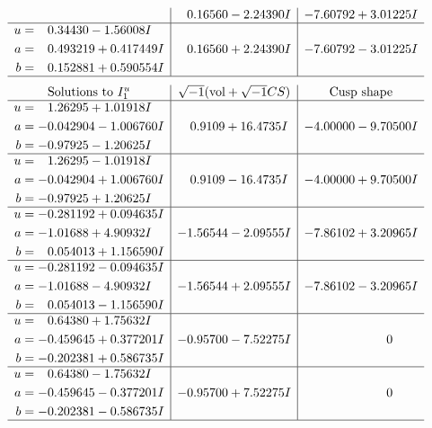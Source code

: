 \documentclass[1p]{elsarticle_modified}
\theoremstyle{definition}
\newcommand{\I}{\sqrt{-1}}
\begin{document}
$$\begin{array}{c|c|c}
 & \phantom{-}0.16560 - 2.24390 I & -7.60792 + 3.01225 I \\ \hline\begin{aligned}
u &= \phantom{-}0.34430 - 1.56008 I \\
a &= \phantom{-}0.493219 + 0.417449 I \\
b &= \phantom{-}0.152881 + 0.590554 I\end{aligned}
 & \phantom{-}0.16560 + 2.24390 I & -7.60792 - 3.01225 I\\
 \hline 
 \end{array}$$\newpage$$\begin{array}{c|c|c}  
\text{Solutions to }I^u_{1}& \I (\text{vol} + \sqrt{-1}CS) & \text{Cusp shape}\\
 \hline 
\begin{aligned}
u &= \phantom{-}1.26295 + 1.01918 I \\
a &= -0.042904 - 1.006760 I \\
b &= -0.97925 - 1.20625 I\end{aligned}
 & \phantom{-}0.9109 + 16.4735 I & -4.00000 - 9.70500 I \\ \hline\begin{aligned}
u &= \phantom{-}1.26295 - 1.01918 I \\
a &= -0.042904 + 1.006760 I \\
b &= -0.97925 + 1.20625 I\end{aligned}
 & \phantom{-}0.9109 - 16.4735 I & -4.00000 + 9.70500 I \\ \hline\begin{aligned}
u &= -0.281192 + 0.094635 I \\
a &= -1.01688 + 4.90932 I \\
b &= \phantom{-}0.054013 + 1.156590 I\end{aligned}
 & -1.56544 - 2.09555 I & -7.86102 + 3.20965 I \\ \hline\begin{aligned}
u &= -0.281192 - 0.094635 I \\
a &= -1.01688 - 4.90932 I \\
b &= \phantom{-}0.054013 - 1.156590 I\end{aligned}
 & -1.56544 + 2.09555 I & -7.86102 - 3.20965 I \\ \hline\begin{aligned}
u &= \phantom{-}0.64380 + 1.75632 I \\
a &= -0.459645 + 0.377201 I \\
b &= -0.202381 + 0.586735 I\end{aligned}
 & -0.95700 - 7.52275 I & \phantom{-0.000000 } 0 \\ \hline\begin{aligned}
u &= \phantom{-}0.64380 - 1.75632 I \\
a &= -0.459645 - 0.377201 I \\
b &= -0.202381 - 0.586735 I\end{aligned}
 & -0.95700 + 7.52275 I & \phantom{-0.000000 } 0\\
 \hline 
 \end{array}$$\newpage\newpage\renewcommand{\arraystretch}{1}
\end{document}
